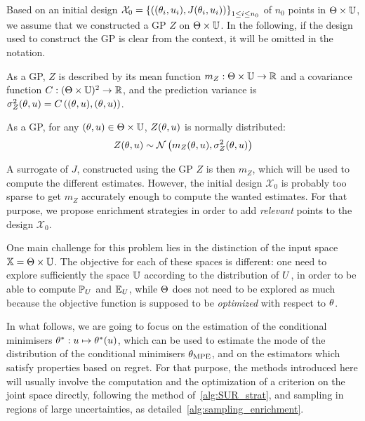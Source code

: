 \documentclass[../../Main_ManuscritThese.tex]{subfiles}
\begin{document}
Based on  an initial design $\mathcal{X}_0 = \left\{\left((\theta_i,u_i),J(\theta_i, u_i) \right)\right\}_{1\leq i \leq n_0}$ of $n_0$ points in $\Theta\times\mathbb{U}$, we assume that we constructed a GP $Z$ on $\Theta \times \mathbb{U}$. In the following, if the design used to construct the GP is clear from the context, it will be omitted in the notation.

As a GP, $Z$ is described by its mean function $m_{Z}:\Theta \times \mathbb{U}\rightarrow\mathbb{R}$ and a covariance function $C:(\Theta\times\mathbb{U})^2\rightarrow \mathbb{R}$, and the prediction variance is $\sigma^2_Z(\theta,u) = C\left((\theta,u), (\theta,u)\right)$.

As a GP, for any $(\theta, u)\in\Theta\times\mathbb{U}$, $Z(\theta, u)$ is normally distributed:
\begin{equation}
  Z(\theta,u) \sim \mathcal{N}\left(m_{Z}(\theta,u), \sigma^2_Z(\theta,u) \right)
\end{equation}

A surrogate of $J$, constructed using the GP $Z$ is then $m_Z$, which will be used to compute the different estimates. However, the initial design $\mathcal{X}_0$ is probably too sparse to get $m_Z$ accurately enough to compute the wanted estimates. For that purpose, we propose enrichment strategies in order to add \emph{relevant} points to the design $\mathcal{X}_0$.

One main challenge for this problem lies in the distinction of the input space $\mathbb{X} = \Theta \times \mathbb{U}$. The objective for each of these spaces is different: one need to explore sufficiently the space $\mathbb{U}$ according to the distribution of $U$, in order to be able to compute $\mathbb{P}_{U}$ and $\mathbb{E}_{U}$, while $\Theta$ does not need to be explored as much because the objective function is supposed to be \emph{optimized} with respect to $\theta$.

In what follows, we are going to focus on the estimation of the conditional minimisers $\theta^*: u\mapsto \theta^*(u)$, which can be used to estimate the mode of the distribution of the conditional minimisers ${\theta}_{\mathrm{MPE}}$, and on the estimators which satisfy properties based on regret.
For that purpose, the methods introduced here will usually involve the computation and the optimization of a criterion on the joint space directly, following the method of~\cref{alg:SUR_strat}, and sampling in regions of large uncertainties, as detailed~\cref{alg:sampling_enrichment}.
\end{document}
